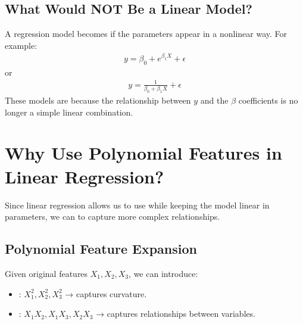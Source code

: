 \documentclass[letterpaper,10pt,english]{jupyterBook}
\begin{document}
\subsection{What Would NOT Be a Linear Model?}
\label{\detokenize{02:what-would-not-be-a-linear-model}}
\sphinxAtStartPar
A regression model becomes  if the parameters appear in a non\sphinxhyphen{}linear way. For example:
\begin{equation*}
\begin{split}
y = \beta_0 + e^{\beta_1 X} + \epsilon
\end{split}
\end{equation*}
\sphinxAtStartPar
or
\begin{equation*}
\begin{split}
y = \frac{1}{\beta_0 + \beta_1 X} + \epsilon
\end{split}
\end{equation*}
\sphinxAtStartPar
These models are  because the relationship between \(y\) and the \(\beta\) coefficients is no longer a simple linear combination.


\section{Why Use Polynomial Features in Linear Regression?}
\label{\detokenize{02:why-use-polynomial-features-in-linear-regression}}
\sphinxAtStartPar
Since linear regression allows us to use  while keeping the model linear in parameters, we can  to capture more complex relationships.


\subsection{Polynomial Feature Expansion}
\label{\detokenize{02:polynomial-feature-expansion}}
\sphinxAtStartPar
Given original features \( X_1, X_2, X_3 \), we can introduce:
\begin{itemize}
\item {} 
\sphinxAtStartPar
{}: \( X_1^2, X_2^2, X_3^2 \) → captures curvature.

\item {} 
\sphinxAtStartPar
{}: \( X_1X_2, X_1X_3, X_2X_3 \) → captures relationships between variables.

\end{itemize}
\end{document}
